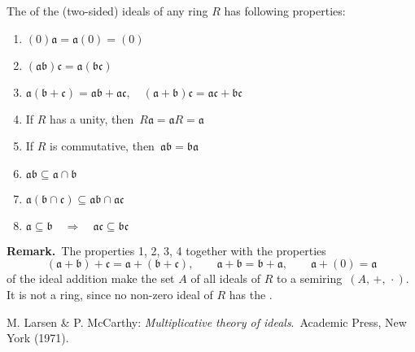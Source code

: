 \documentclass[12pt]{article}
\theoremstyle{definition}
\begin{document}
The  of the (two-sided) ideals of any ring $R$ has following properties:
\begin{enumerate}
\item $(0)\mathfrak{a = a}(0) = (0)$
\item $\mathfrak{(ab)c = a(bc)}$
\item $\mathfrak{a(b+c) = ab+ac, \quad (a+b)c = ac+bc}$
\item If $R$ has a unity, then\, $R\mathfrak{a} = \mathfrak{a}R = \mathfrak{a}$
\item If $R$ is commutative, then\, $\mathfrak{ab = ba}$
\item $\mathfrak{ab \subseteq a\cap b}$
\item $\mathfrak{a(b\cap c) \subseteq ab\cap ac}$
\item $\mathfrak{a\subseteq b\quad\Rightarrow\quad ac\subseteq bc}$\end{enumerate}


\textbf{Remark.}\, The properties 1, 2, 3, 4 together with the properties
$$\mathfrak{(a+b)+c = a+(b+c),\qquad a+b = b+a,\qquad a}+(0) = \mathfrak{a}$$
of the ideal addition make the set $A$ of all ideals of $R$ to a semiring\, $(A,\,+,\,\cdot)$.\, It is not a ring, since no non-zero ideal of $R$ has the .

\begin{thebibliography}{9}
 {\sc M. Larsen \& P. McCarthy}: {\it Multiplicative theory of ideals}.\, Academic Press, New York (1971).
\end{thebibliography}

\end{document}
